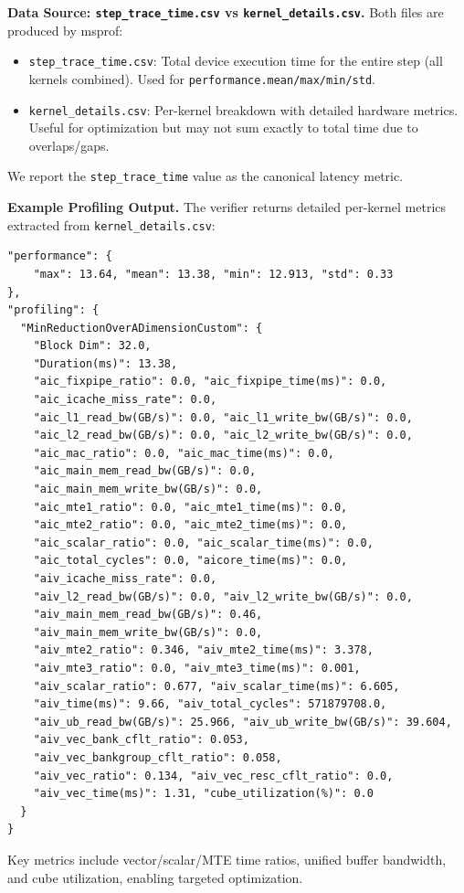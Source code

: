\documentclass{article} %
\theoremstyle{definition}
\theoremstyle{remark}
\begin{document}
  \textbf{Data Source: \texttt{step\_trace\_time.csv} vs \texttt{kernel\_details.csv}.}
  Both files are produced by msprof:
  \begin{itemize}
      \item \texttt{step\_trace\_time.csv}: Total device execution time for the entire step (all kernels combined). Used for \texttt{performance.mean/max/min/std}.
      \item \texttt{kernel\_details.csv}: Per-kernel breakdown with detailed hardware metrics. Useful for optimization but may not sum exactly to total time due to overlaps/gaps.
  \end{itemize}
  We report the \texttt{step\_trace\_time} value as the canonical latency metric.

  \textbf{Example Profiling Output.}
  The verifier returns detailed per-kernel metrics extracted from \texttt{kernel\_details.csv}:

  \begin{tcolorbox}[colback=orange!8, colframe=orange!40, boxrule=0.5pt, arc=2pt, left=2pt, right=2pt, top=2pt, bottom=2pt, breakable, nobeforeafter]
  \begin{verbatim}
"performance": {
    "max": 13.64, "mean": 13.38, "min": 12.913, "std": 0.33
},
"profiling": {
  "MinReductionOverADimensionCustom": {
    "Block Dim": 32.0,
    "Duration(ms)": 13.38,
    "aic_fixpipe_ratio": 0.0, "aic_fixpipe_time(ms)": 0.0,
    "aic_icache_miss_rate": 0.0,
    "aic_l1_read_bw(GB/s)": 0.0, "aic_l1_write_bw(GB/s)": 0.0,
    "aic_l2_read_bw(GB/s)": 0.0, "aic_l2_write_bw(GB/s)": 0.0,
    "aic_mac_ratio": 0.0, "aic_mac_time(ms)": 0.0,
    "aic_main_mem_read_bw(GB/s)": 0.0, 
    "aic_main_mem_write_bw(GB/s)": 0.0,
    "aic_mte1_ratio": 0.0, "aic_mte1_time(ms)": 0.0,
    "aic_mte2_ratio": 0.0, "aic_mte2_time(ms)": 0.0,
    "aic_scalar_ratio": 0.0, "aic_scalar_time(ms)": 0.0,
    "aic_total_cycles": 0.0, "aicore_time(ms)": 0.0,
    "aiv_icache_miss_rate": 0.0,
    "aiv_l2_read_bw(GB/s)": 0.0, "aiv_l2_write_bw(GB/s)": 0.0,
    "aiv_main_mem_read_bw(GB/s)": 0.46, 
    "aiv_main_mem_write_bw(GB/s)": 0.0,
    "aiv_mte2_ratio": 0.346, "aiv_mte2_time(ms)": 3.378,
    "aiv_mte3_ratio": 0.0, "aiv_mte3_time(ms)": 0.001,
    "aiv_scalar_ratio": 0.677, "aiv_scalar_time(ms)": 6.605,
    "aiv_time(ms)": 9.66, "aiv_total_cycles": 571879708.0,
    "aiv_ub_read_bw(GB/s)": 25.966, "aiv_ub_write_bw(GB/s)": 39.604,
    "aiv_vec_bank_cflt_ratio": 0.053, 
    "aiv_vec_bankgroup_cflt_ratio": 0.058,
    "aiv_vec_ratio": 0.134, "aiv_vec_resc_cflt_ratio": 0.0,
    "aiv_vec_time(ms)": 1.31, "cube_utilization(%)": 0.0
  }
}
  \end{verbatim}
  \end{tcolorbox}
  Key metrics include vector/scalar/MTE time ratios, unified buffer bandwidth, and cube utilization, enabling targeted optimization.
\end{document}
